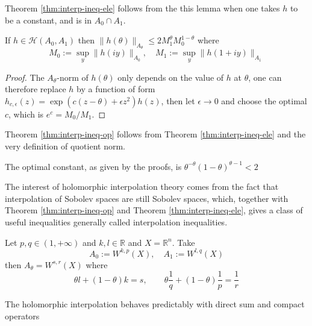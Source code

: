 Theorem \ref{thm:interp-ineq-ele} follows from the this lemma when one takes \(h\) to be a
constant, and is in \(A_0\cap A_1\).

\begin{lemma}
\label{lem:interp-ineq}
If \(h\in \mathcal{H}(A_0, A_1)\) then \(\| h(\theta)\|_{A_\theta}\leq 2 M_1^{\theta}  M_0^{1-\theta}\)
where
\[
 M_0:= \sup_y \|h(iy)\|_{A_0} ,\quad M_1:=\sup_y \| h(1+iy)\|_{A_1}
\]
\end{lemma}
\begin{proof}
The \(A_\theta\)-norm of \(h(\theta)\) only depends on the value of \(h\) at \(\theta\), one can therefore replace \(h\) by a function of form \(h_{c,\epsilon}(z) = \exp
(c(z-\theta) + \epsilon z^2) h(z)\), then let \(\epsilon\to 0\) and choose the optimal
\(c\), which is \(e^c=M_0/M_1\).
\end{proof}

Theorem \ref{thm:interp-ineq-op} follows from Theorem \ref{thm:interp-ineq-ele} and the very
definition of quotient norm.

\begin{remark}
The optimal constant, as given by the proofs, is \(\theta^{-\theta}(1-\theta)^{\theta-1} < 2\)
\end{remark}

The interest of holomorphic interpolation theory comes from the fact that interpolation of
Sobolev spaces are still Sobolev spaces, which, together with Theorem
\ref{thm:interp-ineq-op} and Theorem \ref{thm:interp-ineq-ele}, gives a class of useful
inequalities generally called interpolation inequalities.

\begin{theorem}
\label{thm:interp-sobolev}
Let \(p,q\in (1,+\infty)\) and \(k,l\in \mathbb{R}\) and \(X=\mathbb{R}^n\). Take 
\[
 A_0:= W^{k,p}(X),\quad A_1:=W^{l,q}(X)
\]
then \(A_\theta=W^{s,r}(X)\) where
\[
 \theta l + (1-\theta)k = s,\qquad \theta \frac{1}{q} + (1-\theta) \frac{1}{p} = \frac{1}{r}
\]
\end{theorem}

The holomorphic interpolation behaves predictably with direct sum and compact operators

